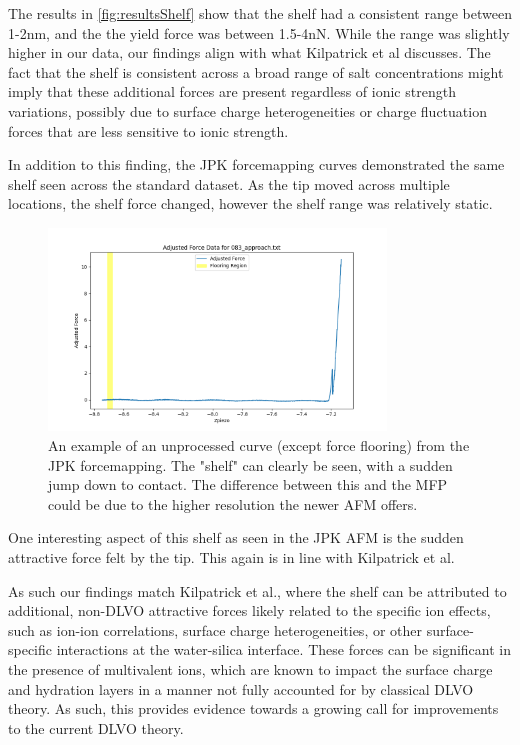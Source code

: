 The results in \ref{fig:resultsShelf} show that the shelf had a consistent range between 1-2nm, and the the yield force was between 1.5-4nN. While the range was slightly higher in our data, our findings align with what Kilpatrick et al discusses. The fact that the shelf is consistent across a broad range of salt concentrations might imply that these additional forces are present regardless of ionic strength variations, possibly due to surface charge heterogeneities or charge fluctuation forces that are less sensitive to ionic strength.

In addition to this finding, the JPK forcemapping curves demonstrated the same shelf seen across the standard dataset. As the tip moved across multiple locations, the shelf force changed, however the shelf range was relatively static.

\begin{figure}[h!!]
\centering
\includegraphics[width=0.8\textwidth]{chapter8/Shelf/083_approach.png}
\caption{An example of an unprocessed curve (except force flooring) from the JPK forcemapping. The "shelf" can clearly be seen, with a sudden jump down to contact. The difference between this and the MFP could be due to the higher resolution the newer AFM offers.}
\label{fig:noisey}
\end{figure}

One interesting aspect of this shelf as seen in the JPK AFM is the sudden attractive force felt by the tip. This again is in line with Kilpatrick et al.

As such our findings match Kilpatrick et al., where the shelf can be attributed to additional, non-DLVO attractive forces likely related to the specific ion effects, such as ion-ion correlations, surface charge heterogeneities, or other surface-specific interactions at the water-silica interface. These forces can be significant in the presence of multivalent ions, which are known to impact the surface charge and hydration layers in a manner not fully accounted for by classical DLVO theory. As such, this provides evidence towards a growing call for improvements to the current DLVO theory.

